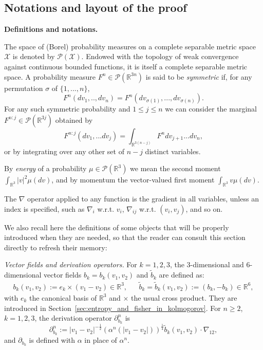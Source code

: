 \documentclass[11pt,a4paper]{article}
\theoremstyle{definition}
\theoremstyle{plain}
\begin{document}
\subsection{Notations and layout of the proof}

\textbf{Definitions and notations.}

The space of (Borel) probability measures on a complete separable metric space $\mathcal{X}$ is denoted by $\mathcal{P}(\mathcal{X})$. Endowed with the topology of weak convergence against continuous bounded functions, it is itself a complete separable metric space. A probability measure $F^n\in\mathcal{P}(\mathbb{R}^{3n})$ is said to be \textit{symmetric} if, for any permutation $\sigma$ of $\{1,...,n\}$, $$F^n(dv_1,..,dv_n)=F^n(dv_{\sigma(1)},...,dv_{\sigma(n)}).$$
For any such symmetric probability and $1\leq j \leq n$ we can consider the marginal $F^{n:j}\in\mathcal{P}(\mathbb{R}^{3j})$ obtained by
$$F^{n:j}(dv_1,...dv_j)=\int_{\mathbb{R}^{3(n-j)}} F^{n} dv_{j+1}...dv_n,$$
or by integrating over any other set of $n-j$ distinct variables.

By \textit{energy} of a probability $\mu\in\mathcal{P}(\mathbb{R}^{3})$ we mean the second moment $\int_{\mathbb{R}^3} \vert v\vert^2 \mu(dv)$, and by momentum the vector-valued first moment $\int_{\mathbb{R}^3} v \mu(dv)$.

The $\nabla$ operator applied to any function is the gradient in all variables, unless an index is specified, such as $\nabla_i$ w.r.t. $v_i$, $\nabla_{ij}$ w.r.t. $(v_i,v_j)$, and so on.

We also recall here the definitions of some objects that will be properly introduced when they are needed, so that the reader can consult this section directly to refresh their memory:

\noindent \textit{Vector fields and derivation operators.}
For $k=1,2,3$, the $3$-dimensional and $6$-dimensional vector fields $b_k=b_k(v_1,v_2)$ and $\tilde{b}_k$ are defined as:
\begin{align*}
b_k(v_1,v_2):=e_k \times (v_1-v_2)\in \mathbb{R}^3, &&\tilde{b}_k=\tilde{b}_k(v_1,v_2):=(b_k,-b_k) \in \mathbb{R}^6,
\end{align*}
with $e_k$ the canonical basis of $\mathbb{R}^3$ and $\times$ the usual cross product. They are introduced in Section~\ref{sec:entropy_and_fisher_in_kolmogorov}.
For $n\geq 2$, $k=1,2,3$, the derivation operator $\partial^n_{b_k}$ is
$$\partial^n_{b_k}:=\vert v_1-v_2\vert^{-\frac{1}{2}} (\alpha^n(\vert v_1-v_2\vert ))^{\frac{1}{4}}\tilde{b}_k(v_1,v_2)\cdot \nabla_{12},$$
and $\partial_{b_k}$ is defined with $\alpha$ in place of $\alpha^n$.
\end{document}

